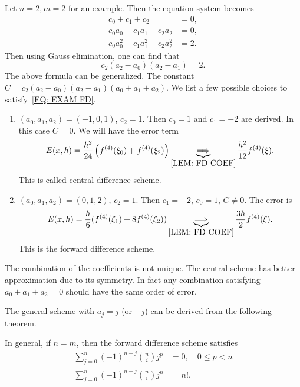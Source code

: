 \begin{example}
    Let $n = 2, m = 2$ for an example. Then the equation system becomes 
    \begin{equation}\label{EQ: EXAM FD}
        \begin{aligned}
            c_0  + c_1  + c_2  &= 0, \\
            c_0 a_0 + c_1 a_1 + c_2 a_2 &= 0, \\
            c_0 a_0^2 + c_1 a_1^2 + c_2 a_2^2 &= 2.  
        \end{aligned}
    \end{equation}
    Then using Gauss elimination, one can find that 
    $$c_2 (a_2 - a_0) (a_2 - a_1) = 2.$$
    The above formula can be generalized. The constant $C = c_2(a_2 - a_0)(a_2 - a_1) (a_0 + a_1 + a_2)$. We list a few possible choices to satisfy~\eqref{EQ: EXAM FD}. 
    \begin{enumerate}
        \item $(a_0, a_1, a_2) = (-1, 0, 1)$, $c_2 = 1$. Then $c_0 = 1$ and $c_1 = -2$ are derived. In this case $C = 0$. We will have the error term 
        $$E(x, h) = \frac{h^2}{24}\left(f^{(4)}(\xi_0) + f^{(4)}(\xi_2)\right) \underbrace{\Longrightarrow }_{\ref{LEM: FD COEF}} \frac{h^2}{12} f^{(4)}(\xi).$$
        This is called central difference scheme.
        \item $(a_0, a_1, a_2) = (0, 1, 2)$, $c_2 = 1$. Then $c_1 = -2$, $c_0 = 1$,  $C \neq 0$. The error is 
        $$E(x, h) = \frac{h}{6} (f^{(4)}(\xi_1) + 8 f^{(4)}(\xi_2)) \underbrace{\Longrightarrow }_{\ref{LEM: FD COEF}} \frac{3h}{2} f^{(4)}(\xi).$$
        This is the forward difference scheme.
    \end{enumerate}
    The combination of the coefficients is not unique. The central scheme has better approximation due to its symmetry. In fact any combination satisfying $a_0 + a_1 + a_2 = 0$ should have the same order of error.
\end{example}
The general scheme with $a_j = j$ (or $-j$) can be derived from the following theorem.
\begin{theorem}\label{THM: FWD DIFF}
    In general, if $n = m$, then the forward difference scheme satisfies 
    \begin{equation}
        \begin{aligned}
            \sum_{j=0}^n (-1)^{n-j} \binom{n}{i} j^p &= 0,\quad 0\le p < n \\
            \sum_{j=0}^n (-1)^{n-j} \binom{n}{i} j^n &= n!.   
        \end{aligned}
    \end{equation}
\end{theorem}
